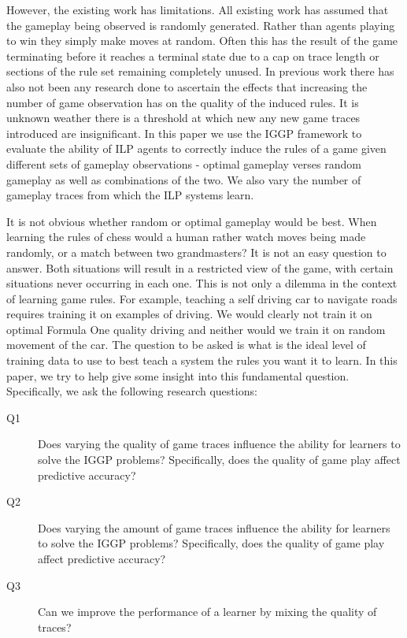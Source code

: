However, the existing work has limitations. All existing work has assumed that the gameplay being observed is randomly generated. Rather than agents playing to win they simply make moves at random. Often this has the result of the game terminating before it reaches a terminal state due to a cap on trace length or sections of the rule set remaining completely unused. In previous work there has also not been any research done to ascertain the effects that increasing the number of game observation has on the quality of the induced rules. It is unknown weather there is a threshold at which new any new game traces introduced are insignificant. In this paper we use the IGGP framework to evaluate the ability of ILP agents to correctly induce the rules of a game given different sets of gameplay observations - optimal gameplay verses random gameplay as well as combinations of the two. We also vary the number of gameplay traces from which the ILP systems learn. 


It is not obvious whether random or optimal gameplay would be best. When learning the rules of chess would a human rather watch moves being made randomly, or a match between two grandmasters? It is not an easy question to answer. Both situations will result in a restricted view of the game, with certain situations never occurring in each one. This is not only a dilemma in the context of learning game rules. For example, teaching a self driving car to navigate roads requires training it on examples of driving. We would clearly not train it on optimal Formula One quality driving and neither would we train it on random movement of the car. The question to be asked is what is the ideal level of training data to use to best teach a system the rules you want it to learn. In this paper, we try to help give some insight into this fundamental question. Specifically, we ask the following research questions:

\begin{description}
\item[Q1] Does varying the quality of game traces influence the ability for learners to solve the IGGP problems? Specifically, does the quality of game play affect predictive accuracy?
\item[Q2] Does varying the amount of game traces influence the ability for learners to solve the IGGP problems? Specifically, does the quality of game play affect predictive accuracy?
\item[Q3] Can we improve the performance of a learner by mixing the quality of traces?
\end{description}

